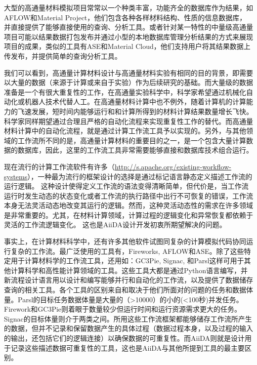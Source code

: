 大型的高通量材料模拟项目常常以一个种类丰富，功能齐全的数据库作为结果，如AFLOW\cite{curtarolo2012aflowlib}和Material Project\cite{jain2011high}，他们包含各种各样材料结构、性质的信息数据库，并直接提供了能够直接使用的查询、分析工具。或者针对某一特性的中量级高通量项目可能以结果数据打包发布并通过小型的本地数据库管理分析结果的方式来展现项目的成果，类似的工具有ASE\cite{larsen2017atomic}和Material Cloud\cite{talirz2020materials}，他们支持用户将其结果数据上传发布，并提供简单的查询分析工具。

我们可以看到，高通量计算材料设计与高通量材料实验有相同的目的背景，即需要以大量的数据（来源于计算或来自于实验）作为后续研究的基础。而大量级的数据准备是一个有很大重复性的工作，在高通量实验科学中，科学家希望通过机械化自动化或机器人技术代替人工。在高通量材料计算中也不例外，随着计算机的计算能力的飞速发展，短时间内能够运行和和计算所得到的材料计算结果数量增长飞快。科学家同样期望通过合理且严格的自动化流程来实现重复性工作的替代。而高通量材料计算中的自动化流程，就是通过计算工作流工具予以实现的。另外，与其他领域的工作流所不同的是，高通量计算材料的重要目的之一，是一个包含大量计算数据的数据库，因此，这里的工作流工具非常需要能够直接和数据库技术组合运行。

现在流行的计算工作流软件有许多（\url{http://s.apache.org/existing-workflow-systems}），一种最为流行的框架设计的选择是通过标记语言静态定义描述工作流的运行逻辑。
这种设计使得定义工作流的语法变得清晰简单，但代价是，当工作流运行时发生动态的状态变化或者工作流的执行路径中出行不可恢复的错误，工作流本身无法灵活动态地改变其运行的逻辑。然而，这种灵活动态性的需求在许多领域是非常重要的。尤其，在材料计算领域，计算过程的逻辑变化和异常恢复都依赖于灵活的工作流逻辑变化。
这也是AiiDA设计开发初衷所期望解决的问题。

事实上，在计算材料科学中，还有许多其他软件试图同复杂的计算模拟代码协同运行复杂的工作流。最广泛使用的工具有，Fireworks\cite{jain2015fireworks}, AFLOW\cite{curtarolo2012aflow}和ASE\cite{larsen2017atomic}。除了这些特定用于计算材料学的工作流工具，还用如：GC3Pie\cite{maffioletti2012gc3pie}, Signac\cite{adorf2018simple}, 和Parsl\cite{babuji2019parsl}这样可用于其他计算科学和高性能计算领域的工具。这些工具大都是通过Python语言编写，并新流程设计语言用以设计和编写能够并行和自动化的工作流，以及提供了数据储存查询的相关工具。各个工具的区别来自和取决于他们所面对的问题的任务和数据体量。Parsl的目标任务数据体量是大量的（>10000）的小的(<100秒)并发任务。Firework和GC3Pie则着眼于数量较少但运行时间和运行资源需求更大的任务。Signac的目标体量则介于两类之间。所用这些工作流框架都能够储存工作流所产生的数据，但并不记录和保留数据产生的具体过程（数据过程本身，以及过程的输入的输出，还包括它们的逻辑连接）以确保数据的可重复性。而AiiDA则就是设计用于记录这些描述数据可重复性的工具，这也是AiiDA与其他所提到工具的最主要区别。


